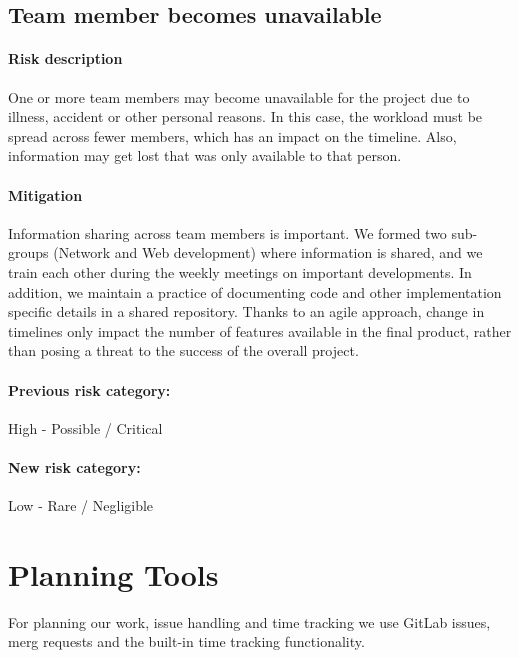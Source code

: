 \subsection{Team member becomes unavailable}
\paragraph{Risk description} One or more team members may become unavailable for the project due to illness, accident or other personal reasons. In this case, the workload must be spread across fewer members, which has an impact on the timeline. Also, information may get lost that was only available to that person.
\paragraph{Mitigation} Information sharing across team members is important. We formed two sub-groups (Network and Web development) where information is shared, and we train each other during the weekly meetings on important developments. In addition, we maintain a practice of documenting code and other implementation specific details in a shared repository. Thanks to an agile approach, change in timelines only impact the number of features available in the final product, rather than posing a threat to the success of the overall project.
\paragraph{Previous risk category:} High - Possible / Critical
\paragraph{New risk category:} Low - Rare / Negligible

\section{Planning Tools}
For planning our work, issue handling and time tracking we use GitLab issues, merg requests and the built-in time tracking functionality.
